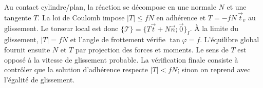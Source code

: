 \begin{corrigebox}
Au contact cylindre/plan, la réaction se décompose en une normale $N$ et
            une tangente $T$. La loi de Coulomb impose $|T|\le fN$ en adhérence et
            $T=-fN\,\vec t_v$ au glissement. Le torseur local est donc
            $\{\mathcal T\}=\{T\vec t+N\vec n;\vec0\}_I$.
À la limite du glissement, $|T|=fN$ et l'angle de frottement vérifie
            $\tan\varphi=f$. L'équilibre global fournit ensuite $N$ et $T$ par projection
            des forces et moments.
Le sens de $T$ est opposé à la vitesse de glissement probable. La
            vérification finale consiste à contrôler que la solution d'adhérence respecte
            $|T|<fN$; sinon on reprend avec l'égalité de glissement.
\end{corrigebox}
